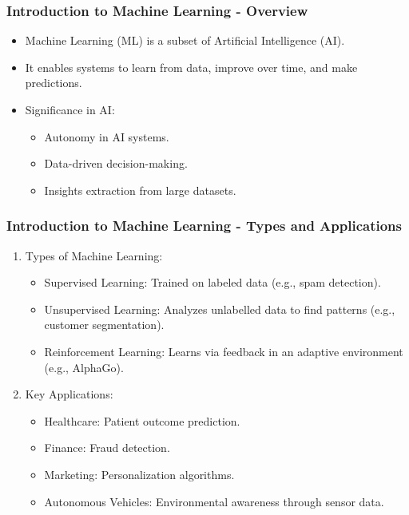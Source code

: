 \documentclass[aspectratio=169]{beamer}
\begin{document}
\frame{\titlepage}

\begin{frame}[fragile]
    \frametitle{Introduction to Machine Learning - Overview}
    \begin{itemize}
        \item Machine Learning (ML) is a subset of Artificial Intelligence (AI).
        \item It enables systems to learn from data, improve over time, and make predictions.
        \item Significance in AI:
        \begin{itemize}
            \item Autonomy in AI systems.
            \item Data-driven decision-making.
            \item Insights extraction from large datasets.
        \end{itemize}
    \end{itemize}
\end{frame}

\begin{frame}[fragile]
    \frametitle{Introduction to Machine Learning - Types and Applications}
    \begin{enumerate}
        \item Types of Machine Learning:
        \begin{itemize}
            \item Supervised Learning: Trained on labeled data (e.g., spam detection).
            \item Unsupervised Learning: Analyzes unlabelled data to find patterns (e.g., customer segmentation).
            \item Reinforcement Learning: Learns via feedback in an adaptive environment (e.g., AlphaGo).
        \end{itemize}
        \item Key Applications:
        \begin{itemize}
            \item Healthcare: Patient outcome prediction.
            \item Finance: Fraud detection.
            \item Marketing: Personalization algorithms.
            \item Autonomous Vehicles: Environmental awareness through sensor data.
        \end{itemize}
    \end{enumerate}
\end{frame}
\end{document}
